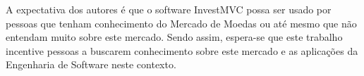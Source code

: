 
A expectativa dos autores é que o software InvestMVC possa ser usado por pessoas que tenham conhecimento do Mercado de Moedas ou até mesmo que não entendam muito sobre este mercado. Sendo assim, espera-se que este trabalho incentive pessoas a buscarem conhecimento sobre este mercado e as aplicações da Engenharia de Software neste contexto.